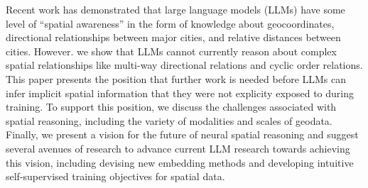 
Recent work has demonstrated that large language models (LLMs) have some level of ``spatial awareness'' in the form of knowledge about geocoordinates, directional relationships between major cities, and relative distances between cities.
%
However. we show that LLMs cannot currently reason about complex spatial relationships like multi-way directional relations and cyclic order relations. %
%
This paper presents the position that further work is needed before LLMs can infer implicit spatial information that they were not explicity exposed to during training.
%
To support this position, we discuss the challenges associated with spatial reasoning, including the variety of modalities and scales of geodata.
%
Finally, we present a vision for the future of neural spatial reasoning and suggest several avenues of research to advance current LLM research towards achieving this vision, including devising new embedding methods and developing intuitive self-supervised training objectives for spatial data.